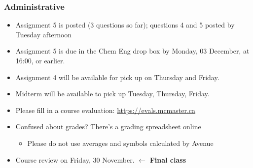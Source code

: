 \begin{comment}
	Why remove water
	Terminology
	Equilibrium curves (C+R, Santiago, p7)

	Psychrometry: useful for determining humidity content (kg//kg) of air at a given temperature and given RH
	Bound vs unbound moisture
	Drying curve


	Equipment for removing water
	Fluidized bed system
\end{comment}

\begin{frame}\frametitle{Administrative}
	\begin{itemize}
		\item	Assignment 5 is posted (3 questions so far); questions 4 and 5 posted by Tuesday afternoon
		\item	Assignment 5 is due in the Chem Eng drop box by Monday, 03 December, at 16:00, or earlier.
		\item	Assignment 4 will be available for pick up on Thursday and Friday.
		\item	Midterm will be available to pick up Tuesday, Thursday, Friday.
		\item	Please fill in a course evaluation: \href{https://evals.mcmaster.ca}{https://evals.mcmaster.ca}
		\item	Confused about grades? There's a grading spreadsheet online
		\begin{itemize}
			\item	Please do not use averages and symbols calculated by Avenue
		\end{itemize}
	\end{itemize}
	\vspace{12pt}
	\begin{itemize}
		\item	Course review on Friday, 30 November. {\color{myOrange} \hfill $\longleftarrow$ {\textbf{Final class}}}
	\end{itemize}
\end{frame}

